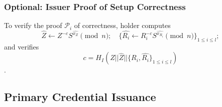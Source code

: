 \subsubsection{Optional: Issuer Proof of Setup Correctness}

To verify the proof $\mathcal{P}_i$ of correctness, holder
computes
$$
\widehat{Z} \leftarrow Z^{-c} S^{\widehat{x_Z}}\pmod{n} ;\quad  \{\widehat{R_i} 
\leftarrow R_i^{-c} S^{\widehat{x_{R_i}}}\pmod{n}\}_{1\leq i \leq l};
$$
and verifies 
$$
c =  H_I(Z||\widehat{Z}||\{R_i,\widehat{R_i}\}_{1\leq i \leq l})
$$.


\subsection{Primary Credential Issuance}
\begin{comment}
\begin{enumerate}
    \item Retrieve the current  value $\mathrm{acc}$ for accumulator $A_{R_i}$ and the  set $V$ of issued and non-revoked credential numbers.
    \item $H()$ is a hash function where the output length is 256 bits.
    \item $||$ denotes concatenation.
    \item $U_i$ is the identifier of the user $i$.
    \item Compute $$
\overline{S} = A_{R_i}||U_i,\quad H_{\overline{S}} = H(\overline{S})
$$ 
and sets $m_2 = H_{\overline{S}}$.
    \item Create 256-bit integer attributes $\{m_i\}_{i \in A_k}$ for the holder.
    \item Generate 80-bit nonce $n_0$ and send to the holder.
\end{enumerate}
Holder:

\end{comment}


